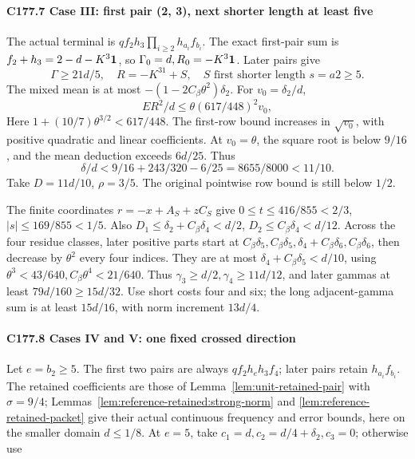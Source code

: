 \paragraph{C177.7 Case III: first pair (2, 3), next shorter length at least five}

The actual terminal is \(qf_2h_3\prod_{i\ge2}h_{a_i}f_{b_i}\). The exact first-pair sum is \(f_2+h_3=2-d-K^3\mathbf1\), so \(\Gamma_0=d,\allowbreak \allowbreak  R_0=-K^3\mathbf1\). Later pairs give
\[
\Gamma\ge21d/5,\quad R=-K^31+S,\quad S\text{ first shorter length }s=a2\ge5.
\]
The mixed mean is at most \(-(1-2C_\beta\theta^2)\delta_2\). For \(v_0=\delta_2/d\),
\[
ER^2/d\le\theta(617/448)^2v_0,
\]
Here \(1+(10/7)\theta^{3/2}<617/448\). The first-row bound increases in \(\sqrt{v_0}\), with positive quadratic and linear coefficients. At \(v_0=\theta\), the square root is below \(9/16\), and the mean deduction exceeds \(6d/25\). Thus
\[
\delta/d<9/16+243/320-6/25=8655/8000<11/10.
\]
Take \(D=11d/10\), \(\rho=3/5\). The original pointwise row bound is still below \(1/2\).

The finite coordinates \(r=-x+A_S+zC_S\) give \(0\le t\le416/855<2/3\), \(|s|\le169/855<1/5\). Also \(D_1\le \delta_2+C_\beta \delta_4<d/2\), \(D_2\le C_\beta \delta_4<d/12\). Across the four residue classes, later positive parts start at \(C_\beta \delta_5,\allowbreak \allowbreak  C_\beta \delta_5,\allowbreak \allowbreak  \delta_4+C_\beta \delta_6,\allowbreak \allowbreak  C_\beta \delta_6\), then decrease by \(\theta^2\) every four indices. They are at most \(\delta_4+C_\beta \delta_5<d/10\), using \(\theta^3<43/640,\allowbreak \allowbreak  C_\beta\theta^4<21/640\). Thus \(\gamma_3\ge d/2,\allowbreak \allowbreak  \gamma_4\ge11d/12\), and later gammas at least \(79d/160\ge15d/32\). Use short costs four and six; the long adjacent-gamma sum is at least \(15d/16\), with norm increment \(13d/4\).

\paragraph{C177.8 Cases IV and V: one fixed crossed direction}

Let \(e=b_2\ge5\). The first two pairs are always \(qf_2h_eh_3f_4\); later pairs retain \(h_{a_i}f_{b_i}\). The retained coefficients are those of Lemma~\ref{lem:unit-retained-pair} with $\sigma=9/4$; Lemmas~\ref{lem:reference-retained:strong-norm} and \ref{lem:reference-retained-packet} give their actual continuous frequency and error bounds, here on the smaller domain \(d\le1/8\). At \(e=5\), take \(c_1=d,\allowbreak \allowbreak  c_2=d/4+\delta_2,\allowbreak \allowbreak  c_3=0\); otherwise use


